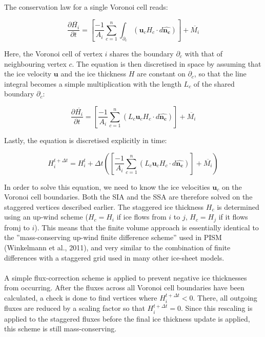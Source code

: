 \documentclass{article}
\begin{document}
The conservation law for a single Voronoi cell reads:

\begin{equation}
\frac{\partial \overline{H_i}}{\partial t} = \left[ \frac{-1}{A_i} \sum_{c=1}^n \int_{\partial_c} \left( \mathbf{u}_c H_c \cdot d\mathbf{\hat{n_c}} \right) \right] + \overline{M_i}
\end{equation}

Here, the Voronoi cell of vertex $i$ shares the boundary $\partial_c$ with that of neighbouring vertex $c$. The equation is then discretised in space by assuming that the ice velocity $\textbf{u}$ and the ice thickness $H$ are constant on $\partial_c$, so that the line integral becomes a simple multiplication with the length $L_c$ of the shared boundary $\partial_c$:

\begin{equation}
\frac{\partial \overline{H_i}}{\partial t} = \left[ \frac{-1}{A_i} \sum_{c=1}^n \left( L_c \mathbf{u}_c H_c \cdot d\mathbf{\hat{n_c}} \right) \right] + \overline{M_i}
\end{equation}

Lastly, the equation is discretised explicitly in time:

\begin{equation}
H_i^{t+\Delta t} = H_i^t + \Delta t \left( \left[ \frac{-1}{A_i} \sum_{c=1}^n \left( L_c \mathbf{u}_c H_c \cdot d\mathbf{\hat{n_c}} \right) \right] + \overline{M_i} \right)
\end{equation}

In order to solve this equation, we need to know the ice velocities $\textbf{u}_c$ on the Voronoi cell boundaries. Both the SIA and the SSA are therefore solved on the staggered vertices described earlier. The staggered ice thickness $H_c$ is determined using an up-wind scheme ($H_c=H_i$ if ice flows from $i$ to $j$, $H_c=H_j$ if it flows from$ $j to $i$). This means that the finite volume approach is essentially identical to the ''mass-conserving up-wind finite difference scheme'' used in PISM (Winkelmann et al., 2011), and very similar to the combination of finite differences with a staggered grid used in many other ice-sheet models.\\
\\
A simple flux-correction scheme is applied to prevent negative ice thicknesses from occurring. After the fluxes across all Voronoi cell boundaries have been calculated, a check is done to find vertices where $H_i^{t+\Delta t}<0$. There, all outgoing fluxes are reduced by a scaling factor so that $H_i^{t+\Delta t}=0$. Since this rescaling is applied to the staggered fluxes before the final ice thickness update is applied, this scheme is still mass-conserving.
\end{document}
